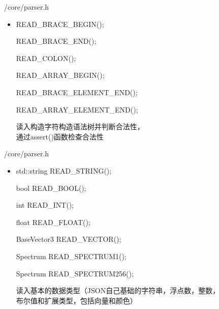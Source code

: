\documentclass{beamer}
\begin{document}
\begin{frame} {/core/parser.h}
\begin{itemize}
\item \begin{semiverbatim} READ\_BRACE\_BEGIN(); \end{semiverbatim}
\begin{semiverbatim} READ\_BRACE\_END(); \end{semiverbatim}
\begin{semiverbatim} READ\_COLON(); \end{semiverbatim}
\begin{semiverbatim} READ\_ARRAY\_BEGIN(); \end{semiverbatim}
\begin{semiverbatim} READ\_BRACE\_ELEMENT\_END(); \end{semiverbatim}
\begin{semiverbatim} READ\_ARRAY\_ELEMENT\_END(); \end{semiverbatim}
读入构造字符构造语法树并判断合法性， \\ 通过assert()函数检查合法性
\end{itemize}
\end{frame}

\begin{frame} {/core/parser.h}
\begin{itemize}
\item \begin{semiverbatim} std::string READ\_STRING(); \end{semiverbatim}
\begin{semiverbatim} bool READ\_BOOL(); \end{semiverbatim}
\begin{semiverbatim} int READ\_INT(); \end{semiverbatim}
\begin{semiverbatim} float READ\_FLOAT(); \end{semiverbatim}
\begin{semiverbatim} BaseVector3 READ\_VECTOR(); \end{semiverbatim}
\begin{semiverbatim} Spectrum READ\_SPECTRUM1(); \end{semiverbatim}
\begin{semiverbatim} Spectrum READ\_SPECTRUM256(); \end{semiverbatim}
读入基本的数据类型（JSON自己基础的字符串，浮点数，整数，\\ 布尔值和扩展类型，包括向量和颜色）
\end{itemize}
\end{frame}
\end{document}
